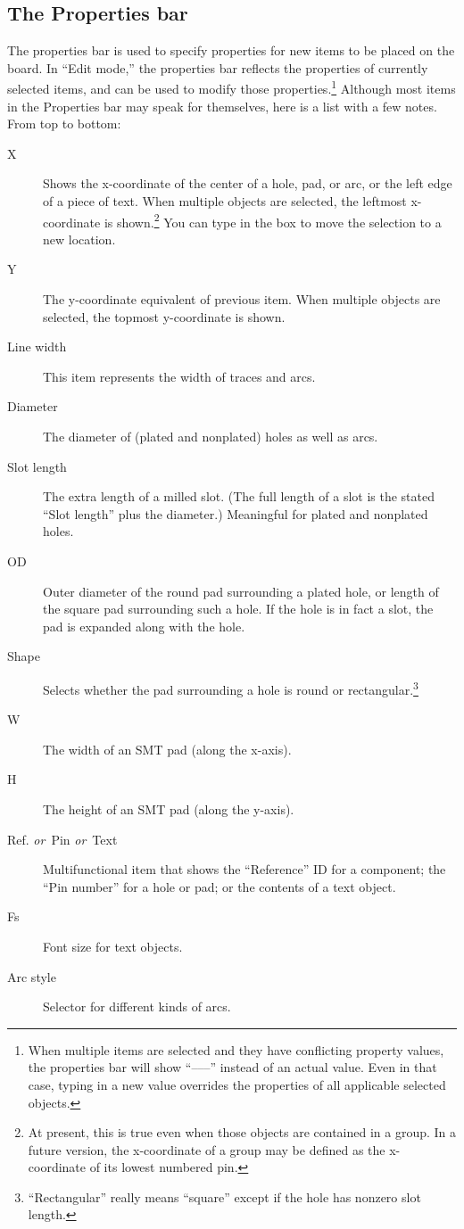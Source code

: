 \documentclass[11pt]{report}
\begin{document}
\subsection{The Properties bar}
The properties bar is used to specify properties for new items to be
placed on the board. In ``Edit mode,'' the properties bar reflects the
properties of currently selected items,
and can be used to modify those properties.\footnote{When multiple items
  are selected and they have conflicting property values, the
  properties bar will show “--{}--{}--'' instead of an actual
  value. Even in that case, typing in a new value overrides the
  properties of all applicable selected objects.}
Although most items in the Properties bar may speak for themselves,
here is a list with a few notes. From top to bottom:
\begin{description}
\item[X] Shows the x-coordinate of the center of a hole, pad, or
  arc, or the left edge of a piece of text. When multiple objects
  are selected, the leftmost x-coordinate is shown.\footnote{At present, this
    is true even when those objects are contained in a group. In a
    future version, the x-coordinate of a group may be defined as the
    x-coordinate of its lowest numbered pin.} You can type in the box
  to move the selection to a new location.
\item[Y] The y-coordinate equivalent of previous item. When
  multiple objects are selected, the topmost
  y-coordinate is shown.
\item[Line width] This item represents the width of traces and
  arcs.
\item[Diameter] The diameter of (plated and nonplated) holes as well
  as arcs.
\item[Slot length] The extra length of a milled slot. (The full
  length of a slot is the stated ``Slot length'' plus the diameter.)
  Meaningful for plated and nonplated holes.
\item[OD] Outer diameter of the round pad surrounding a plated hole, or
  length of the square pad surrounding such a hole. If the hole is in
  fact a slot, the pad is expanded along with the hole.
\item[Shape] Selects whether the pad surrounding a hole is round or
  rectangular.\footnote{``Rectangular'' really means ``square''
    except if the hole has nonzero slot length.}
\item[W] The width of an SMT pad (along the x-axis).
\item[H] The height of an SMT pad (along the y-axis).
\item[Ref. {\normalfont\itshape or}~Pin {\normalfont\itshape
    or}~Text] Multifunctional item that shows the ``Reference'' ID for
  a component; the ``Pin number'' for a hole or pad; or the contents of
  a text object.
\item[Fs] Font size for text objects.
\item[Arc style] Selector for different kinds of arcs.
\end{description}
\end{document}
